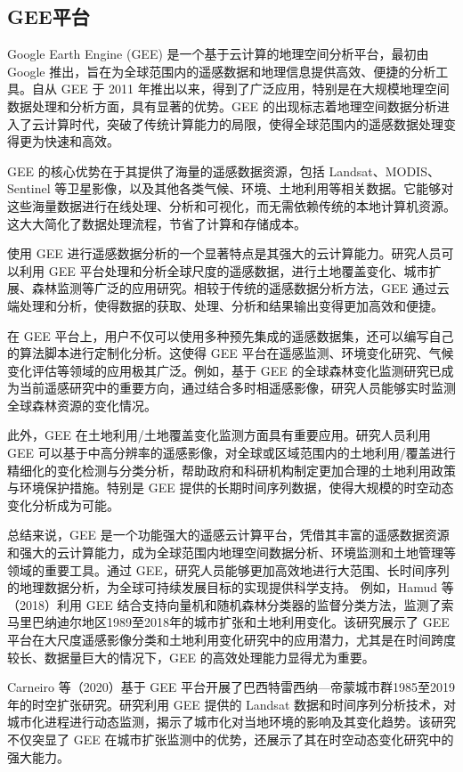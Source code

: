\documentclass{article}
\begin{document}
		
	\subsection{GEE平台}
	Google Earth Engine (GEE) 是一个基于云计算的地理空间分析平台，最初由 Google 推出，旨在为全球范围内的遥感数据和地理信息提供高效、便捷的分析工具。自从 GEE 于 2011 年推出以来，得到了广泛应用，特别是在大规模地理空间数据处理和分析方面，具有显著的优势。GEE 的出现标志着地理空间数据分析进入了云计算时代，突破了传统计算能力的局限，使得全球范围内的遥感数据处理变得更为快速和高效。
	
	GEE 的核心优势在于其提供了海量的遥感数据资源，包括 Landsat、MODIS、Sentinel 等卫星影像，以及其他各类气候、环境、土地利用等相关数据。它能够对这些海量数据进行在线处理、分析和可视化，而无需依赖传统的本地计算机资源。这大大简化了数据处理流程，节省了计算和存储成本。
	
	使用 GEE 进行遥感数据分析的一个显著特点是其强大的云计算能力。研究人员可以利用 GEE 平台处理和分析全球尺度的遥感数据，进行土地覆盖变化、城市扩展、森林监测等广泛的应用研究。相较于传统的遥感数据分析方法，GEE 通过云端处理和分析，使得数据的获取、处理、分析和结果输出变得更加高效和便捷。
	
	在 GEE 平台上，用户不仅可以使用多种预先集成的遥感数据集，还可以编写自己的算法脚本进行定制化分析。这使得 GEE 平台在遥感监测、环境变化研究、气候变化评估等领域的应用极其广泛。例如，基于 GEE 的全球森林变化监测研究已成为当前遥感研究中的重要方向，通过结合多时相遥感影像，研究人员能够实时监测全球森林资源的变化情况。
	
	此外，GEE 在土地利用/土地覆盖变化监测方面具有重要应用。研究人员利用 GEE 可以基于中高分辨率的遥感影像，对全球或区域范围内的土地利用/覆盖进行精细化的变化检测与分类分析，帮助政府和科研机构制定更加合理的土地利用政策与环境保护措施。特别是 GEE 提供的长期时间序列数据，使得大规模的时空动态变化分析成为可能。
	
	总结来说，GEE 是一个功能强大的遥感云计算平台，凭借其丰富的遥感数据资源和强大的云计算能力，成为全球范围内地理空间数据分析、环境监测和土地管理等领域的重要工具。通过 GEE，研究人员能够更加高效地进行大范围、长时间序列的地理数据分析，为全球可持续发展目标的实现提供科学支持。
	例如，Hamud 等（2018）利用 GEE 结合支持向量机和随机森林分类器的监督分类方法，监测了索马里巴纳迪尔地区1989至2018年的城市扩张和土地利用变化。该研究展示了 GEE 平台在大尺度遥感影像分类和土地利用变化研究中的应用潜力，尤其是在时间跨度较长、数据量巨大的情况下，GEE 的高效处理能力显得尤为重要。
	
	Carneiro 等（2020）基于 GEE 平台开展了巴西特雷西纳—帝蒙城市群1985至2019年的时空扩张研究。研究利用 GEE 提供的 Landsat 数据和时间序列分析技术，对城市化进程进行动态监测，揭示了城市化对当地环境的影响及其变化趋势。该研究不仅突显了 GEE 在城市扩张监测中的优势，还展示了其在时空动态变化研究中的强大能力。
	
\end{document}
